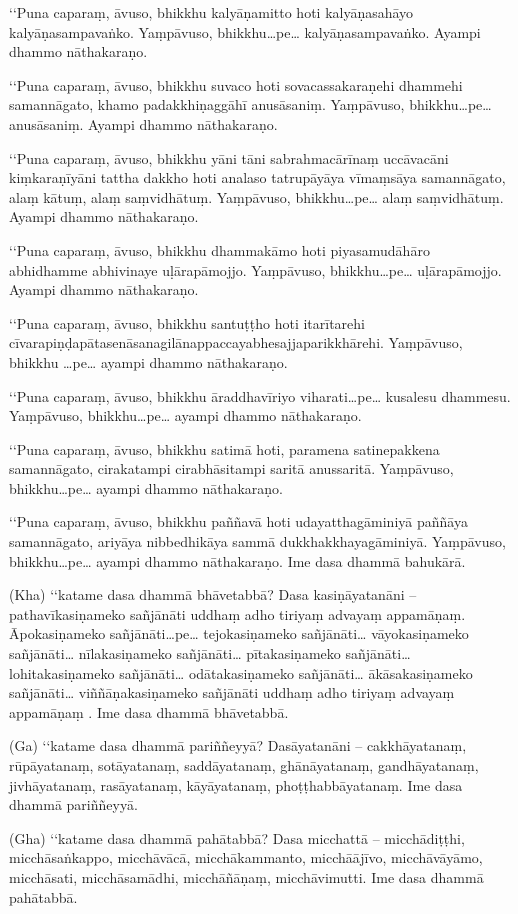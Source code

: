 ‘‘Puna caparaṃ, āvuso, bhikkhu kalyāṇamitto hoti kalyāṇasahāyo kalyāṇasampavaṅko. Yaṃpāvuso, bhikkhu…pe… kalyāṇasampavaṅko. Ayampi dhammo nāthakaraṇo.

‘‘Puna caparaṃ, āvuso, bhikkhu suvaco hoti sovacassakaraṇehi dhammehi samannāgato, khamo padakkhiṇaggāhī anusāsaniṃ. Yaṃpāvuso, bhikkhu…pe… anusāsaniṃ. Ayampi dhammo nāthakaraṇo.

‘‘Puna caparaṃ, āvuso, bhikkhu yāni tāni sabrahmacārīnaṃ uccāvacāni kiṃkaraṇīyāni tattha dakkho hoti analaso tatrupāyāya vīmaṃsāya samannāgato, alaṃ kātuṃ, alaṃ saṃvidhātuṃ. Yaṃpāvuso, bhikkhu…pe… alaṃ saṃvidhātuṃ. Ayampi dhammo nāthakaraṇo.

‘‘Puna caparaṃ, āvuso, bhikkhu dhammakāmo hoti piyasamudāhāro abhidhamme abhivinaye uḷārapāmojjo. Yaṃpāvuso, bhikkhu…pe… uḷārapāmojjo. Ayampi dhammo nāthakaraṇo.

‘‘Puna caparaṃ, āvuso, bhikkhu santuṭṭho hoti itarītarehi cīvarapiṇḍapātasenāsanagilānappaccayabhesajjaparikkhārehi. Yaṃpāvuso, bhikkhu …pe… ayampi dhammo nāthakaraṇo.

‘‘Puna caparaṃ, āvuso, bhikkhu āraddhavīriyo viharati…pe… kusalesu dhammesu. Yaṃpāvuso, bhikkhu…pe… ayampi dhammo nāthakaraṇo.

‘‘Puna caparaṃ, āvuso, bhikkhu satimā hoti, paramena satinepakkena samannāgato, cirakatampi cirabhāsitampi saritā anussaritā. Yaṃpāvuso, bhikkhu…pe… ayampi dhammo nāthakaraṇo.

‘‘Puna caparaṃ, āvuso, bhikkhu paññavā hoti udayatthagāminiyā paññāya samannāgato, ariyāya nibbedhikāya sammā dukkhakkhayagāminiyā. Yaṃpāvuso, bhikkhu…pe… ayampi dhammo nāthakaraṇo. Ime dasa dhammā bahukārā.

(Kha) ‘‘katame dasa dhammā bhāvetabbā? Dasa kasiṇāyatanāni – pathavīkasiṇameko sañjānāti uddhaṃ adho tiriyaṃ advayaṃ appamāṇaṃ. Āpokasiṇameko sañjānāti…pe… tejokasiṇameko sañjānāti… vāyokasiṇameko sañjānāti… nīlakasiṇameko sañjānāti… pītakasiṇameko sañjānāti… lohitakasiṇameko sañjānāti… odātakasiṇameko sañjānāti… ākāsakasiṇameko sañjānāti… viññāṇakasiṇameko sañjānāti uddhaṃ adho tiriyaṃ advayaṃ appamāṇaṃ . Ime dasa dhammā bhāvetabbā.

(Ga) ‘‘katame dasa dhammā pariññeyyā? Dasāyatanāni – cakkhāyatanaṃ, rūpāyatanaṃ, sotāyatanaṃ, saddāyatanaṃ, ghānāyatanaṃ, gandhāyatanaṃ, jivhāyatanaṃ, rasāyatanaṃ, kāyāyatanaṃ, phoṭṭhabbāyatanaṃ. Ime dasa dhammā pariññeyyā.

(Gha) ‘‘katame dasa dhammā pahātabbā? Dasa micchattā – micchādiṭṭhi, micchāsaṅkappo, micchāvācā, micchākammanto, micchāājīvo, micchāvāyāmo, micchāsati, micchāsamādhi, micchāñāṇaṃ, micchāvimutti. Ime dasa dhammā pahātabbā.

